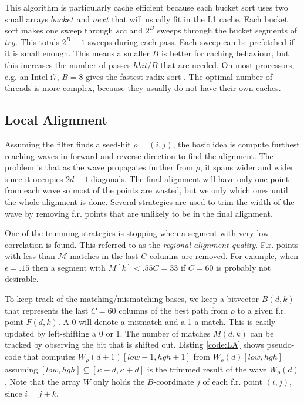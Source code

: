 \documentclass[../main/thesis.tex]{subfiles}
\begin{document}


This algorithm is particularly cache efficient because each bucket sort uses two small arrays $bucket$ and $next$ that will usually fit in the L1 cache.
Each bucket sort makes one sweep through $src$ and $2^B$ sweeps through the bucket segments of $trg$.
This totals $2^B+1$ sweeps during each pass.
Each sweep can be prefetched if it is small enough.
This means a smaller $B$ is better for caching behaviour, but this increases the number of passes $hbit/B$ that are needed.
On most processors, e.g. an Intel i7, $B = 8$ gives the fastest radix sort \cite{Daligner}.
The optimal number of threads is more complex, because they usually do not have their own caches.


\subsection{Local Alignment}
Assuming the filter finds a seed-hit $\rho = (i,j)$, the basic idea is compute furthest reaching waves in forward and reverse direction to find the alignment.
The problem is that as the wave propagates further from $\rho$, it spans wider and wider since it occupies $2d+1$ diagonals.
The final alignment will have only one point from each wave so most of the points are wasted, but we only which ones until the whole alignment is done.
Several strategies are used to trim the width of the wave by removing f.r. points that are unlikely to be in the final alignment.

One of the trimming strategies is stopping when a segment with very low correlation is found.
This referred to as the \textit{regional alignment quality}.
F.r. points with less than $\mathcal{M}$ matches in the last $C$ columns are removed.
For example, when $\epsilon = .15$ then a segment with $M[k] < .55C = 33$ if $C = 60$ is probably not desirable.

To keep track of the matching/mismatching bases, we keep a bitvector $B(d,k)$ that represents the last $C = 60$ columns of the best path from $\rho$ to a given f.r. point $F(d,k)$.
A 0 will denote a mismatch and a 1 a match.
This is easily updated by left-shifting a 0 or 1.
The number of matches $M(d,k)$ can be tracked by observing the bit that is shifted out.
Listing \ref{code:LA} shows pseudo-code that computes $W_\rho(d+1)[low-1,hgh+1]$ from $W_\rho(d)[low,hgh]$ assuming $[low,hgh] \subseteq [\kappa-d,\kappa+d]$ is the trimmed result of the wave $W_\rho(d)$.
Note that the array $W$ only holds the $B$-coordinate $j$ of each f.r. point $(i,j)$, since $i = j + k$.
\end{document}

